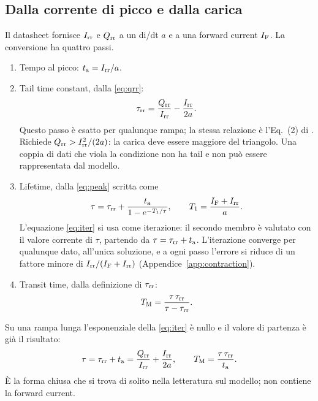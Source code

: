 \documentclass[10pt,a4paper]{scrartcl}
\let\newcommand\pdvaluedefine
\newcommand{\IF}{I_\mathrm{F}}
\newcommand{\Irr}{I_\mathrm{rr}}
\newcommand{\Qrr}{Q_\mathrm{rr}}
\newcommand{\ta}{t_\mathrm{a}}
\newcommand{\taurr}{\tau_\mathrm{rr}}
\newcommand{\TM}{T_\mathrm{M}}
\newcommand{\Tone}{T_1}
\begin{document}
\subsection{Dalla corrente di picco e dalla carica}
\label{sec:invpq}
Il datasheet fornisce $\Irr$ e $\Qrr$ a un di/dt $a$ e a una forward current $\IF$. La conversione ha quattro passi.
\begin{enumerate}
\item Tempo al picco: $\ta = \Irr/a$.
\item Tail time constant, dalla \eqref{eq:qrr}:
\begin{equation}
\taurr = \frac{\Qrr}{\Irr} - \frac{\Irr}{2a} .
\label{eq:taurr}
\end{equation}
Questo passo è esatto per qualunque rampa; la stessa relazione è l'Eq.~(2) di \cite{an6481}. Richiede $\Qrr > \Irr^2/(2a)$: la carica deve essere maggiore del triangolo. Una coppia di dati che viola la condizione non ha tail e non può essere rappresentata dal modello.
\item Lifetime, dalla \eqref{eq:peak} scritta come
\begin{equation}
\tau = \taurr + \frac{\ta}{1 - e^{-\Tone/\tau}} , \qquad \Tone = \frac{\IF+\Irr}{a} .
\label{eq:iter}
\end{equation}
L'equazione \eqref{eq:iter} si usa come iterazione: il secondo membro è valutato con il valore corrente di $\tau$, partendo da $\tau = \taurr + \ta$. L'iterazione converge per qualunque dato, all'unica soluzione, e a ogni passo l'errore si riduce di un fattore minore di $\Irr/(\IF+\Irr)$ (Appendice~\ref{app:contraction}).
\item Transit time, dalla definizione di $\taurr$:
\begin{equation}
\TM = \frac{\tau\,\taurr}{\tau - \taurr} .
\label{eq:tm}
\end{equation}
\end{enumerate}
Su una rampa lunga l'esponenziale della \eqref{eq:iter} è nullo e il valore di partenza è già il risultato:
\begin{equation}
\tau = \taurr + \ta = \frac{\Qrr}{\Irr} + \frac{\Irr}{2a} , \qquad \TM = \frac{\tau\,\taurr}{\ta} .
\label{eq:longinv}
\end{equation}
È la forma chiusa che si trova di solito nella letteratura sul modello; non contiene la forward current.
\end{document}
